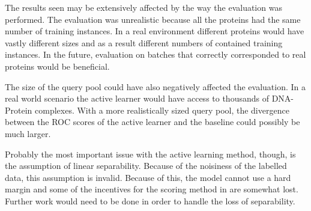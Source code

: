 \documentclass{article}
\begin{document}
The results seen may be extensively affected by the way the evaluation was performed. The evaluation was unrealistic because all the proteins had the same number of training instances. In a real environment different proteins would have vastly different sizes and as a result different numbers of contained training instances. In the future, evaluation on batches that correctly corresponded to real proteins would be beneficial. 

The size of the query pool could have also negatively affected the evaluation. In a real world scenario the active learner would have access to thousands of DNA-Protein complexes. With a more realistically sized query pool, the divergence between the ROC scores of the active learner and the baseline could possibly be much larger. 

Probably the most important issue with the active learning method, though, is the assumption of linear separability. Because of the noisiness of the labelled data, this assumption is invalid. Because of this, the model cannot use a hard margin and some of the incentives for the scoring method in \cite{active_learning} are somewhat lost. Further work would need to be done in order to handle the loss of separability.


{}
\end{document}
